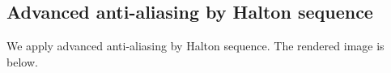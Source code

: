 \documentclass[acmtog]{acmart}
\begin{document}
\newpage

\subsection{Advanced anti-aliasing by Halton sequence}

We apply advanced anti-aliasing by Halton sequence. The rendered image is below.

\begin{figure}[h]
	\centering
\end{figure}
\end{document}
